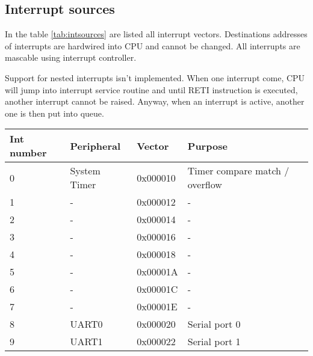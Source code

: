 \subsection{Interrupt sources}

In the table \ref{tab:intsources} are listed all interrupt vectors. Destinations
addresses of interrupts are hardwired into CPU and cannot be changed. All
interrupts are mascable using interrupt controller.

Support for nested interrupts isn't implemented. When one interrupt come, CPU
will jump into interrupt service routine and until RETI instruction is executed,
another interrupt cannot be raised. Anyway, when an interrupt is active, another
one is then put into queue.

\begin{table}[h]
    \centering
    \begin{tabular}{|l|l|l|l|}
        \hline
        \textbf{Int number} & \textbf{Peripheral} & \textbf{Vector} & \textbf{Purpose}               \\ \hline
        0                   & System Timer        & 0x000010        & Timer compare match / overflow \\ \hline
        1                   & -                   & 0x000012        & -                              \\ \hline
        2                   & -                   & 0x000014        & -                              \\ \hline
        3                   & -                   & 0x000016        & -                              \\ \hline
        4                   & -                   & 0x000018        & -                              \\ \hline
        5                   & -                   & 0x00001A        & -                              \\ \hline
        6                   & -                   & 0x00001C        & -                              \\ \hline
        7                   & -                   & 0x00001E        & -                              \\ \hline
        8                   & UART0               & 0x000020        & Serial port 0                  \\ \hline
        9                   & UART1               & 0x000022        & Serial port 1                  \\ \hline

\end{tabular}
\end{table}
